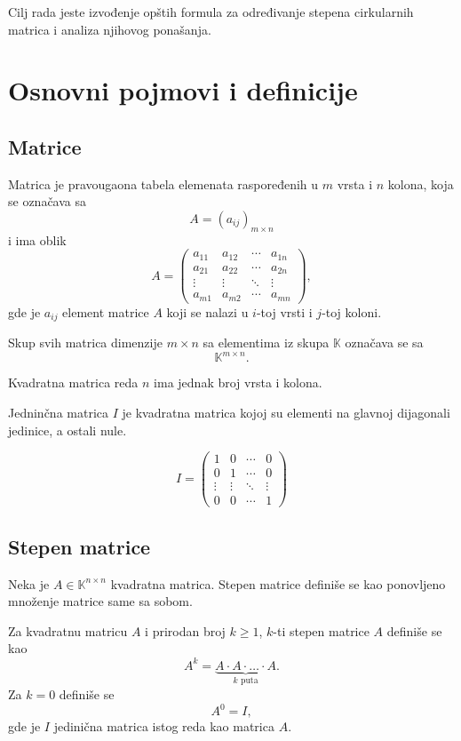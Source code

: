 \documentclass[12pt,a4paper]{report}
\begin{document}
Cilj rada jeste izvođenje opštih formula za određivanje stepena cirkularnih matrica i analiza njihovog ponašanja.

\chapter{Osnovni pojmovi i definicije}

\section{Matrice}

Matrica je pravougaona tabela elemenata raspoređenih u $m$
vrsta i $n$ kolona, koja se označava sa
\[
A=(a_{ij})_{m\times n}
\]
i ima oblik
\[
A=
\begin{pmatrix}
	a_{11} & a_{12} & \cdots & a_{1n}\\
	a_{21} & a_{22} & \cdots & a_{2n}\\
	\vdots & \vdots & \ddots & \vdots\\
	a_{m1} & a_{m2} & \cdots & a_{mn}
\end{pmatrix},
\]
gde je $a_{ij}$ element matrice $A$ koji se nalazi u $i$-toj
vrsti i $j$-toj koloni.

Skup svih matrica dimenzije $m\times n$ sa elementima iz skupa
$\mathbb{K}$ označava se sa
\[
\mathbb{K}^{m\times n}.
\]

Kvadratna matrica reda $n$ ima jednak broj vrsta i kolona.


Jedninčna matrica $I$ je kvadratna matrica kojoj su elementi na glavnoj dijagonali jedinice, a ostali nule.

\[
I=
\begin{pmatrix}
	1 & 0 & \cdots & 0\\
	0 & 1 & \cdots &0\\
	\vdots & \vdots & \ddots & \vdots\\
	0 & 0 & \cdots & 1
\end{pmatrix}
\]

\section{Stepen matrice}

Neka je $A\in\mathbb{K}^{n\times n}$ kvadratna matrica.
Stepen matrice definiše se kao ponovljeno množenje matrice
same sa sobom.


Za kvadratnu matricu $A$ i prirodan broj $k\geq 1$,
$k$-ti stepen matrice $A$ definiše se kao
\[
A^k =
\underbrace{A\cdot A\cdot \dots \cdot A}_{k\text{ puta}}.
\]
Za $k=0$ definiše se
\[
A^0=I,
\]
gde je $I$ jedinična matrica istog reda kao matrica $A$.
\end{document}
